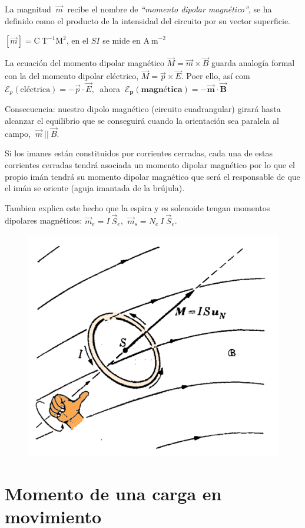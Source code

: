La magnitud $\ \vec m \ $ recibe el nombre de \emph{``momento dipolar magnético''}, se ha definido como el producto de la intensidad del circuito por su vector superficie.

$[\vec m]=\mathrm{C\ T}^{-1} \mathrm{M}^2$, en el $SI$ se mide en $\mathrm{A\ m}^{-2}$

La ecuación del momento dipolar magnético $\vec M=\vec m \times \vec B$ guarda analogía formal con la del momento dipolar eléctrico, $\vec M=\vec p \times \vec E$. Poer ello, así com $\mathcal E_p (\text{eléctrica}) = - \vec p \cdot \vec E,\ $ ahora $\ \boldsymbol{\mathcal E_p(\text{magnética})=-\vec m \cdot \vec B}$

\begin{miparrafodestacado}
Consecuencia: nuestro dipolo magnético (circuito cuadrangular) girará hasta alcanzar el equilibrio que se conseguirá cuando  la orientación sea paralela al campo, $\ \vec m \ || \ \vec B$.	
\end{miparrafodestacado}


\begin{multicols}{2}
Si los imanes están constituidos por corrientes cerradas, cada una de estas corrientes cerradas tendrá asociada un momento dipolar magnético por lo que el propio imán tendrá su momento dipolar magnético que será el responsable de que el imán se oriente (aguja imantada de la brújula).

Tambien explica este hecho que la espira y es solenoide tengan momentos dipolares magnéticos: $\vec m_e=I\ \vec S_e$, $\ \vec m_s=N_e \ I\ \vec S_e$.
\begin{figure}[H]
	\centering
	\includegraphics[width=.55\textwidth]{imagenes/imagenes26/T26IM16.png}
	\end{figure}
\end{multicols}

\section{Momento de una carga en movimiento}

